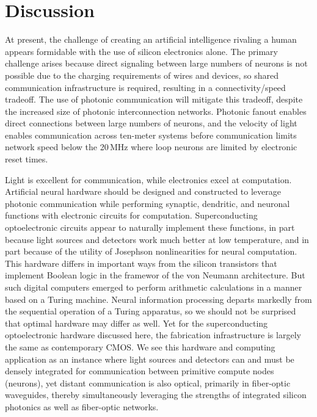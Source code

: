 \documentclass[twocolumn]{article}
\begin{document}
\section{\label{sec:discussion}Discussion}
At present, the challenge of creating an artificial intelligence rivaling a human appears formidable with the use of silicon electronics alone. The primary challenge arises because direct signaling between large numbers of neurons is not possible due to the charging requirements of wires and devices, so shared communication infrastructure is required, resulting in a connectivity/speed tradeoff. The use of photonic communication will mitigate this tradeoff, despite the increased size of photonic interconnection networks. Photonic fanout enables direct connections between large numbers of neurons, and the velocity of light enables communication across ten-meter systems before communication limits network speed below the 20\,MHz where loop neurons are limited by electronic reset times. 

Light is excellent for communication, while electronics excel at computation. Artificial neural hardware should be designed and constructed to leverage photonic communication while performing synaptic, dendritic, and neuronal functions with electronic circuits for computation. Superconducting optoelectronic circuits appear to naturally implement these functions, in part because light sources and detectors work much better at low temperature, and in part because of the utility of Josephson nonlinearities for neural computation. This hardware differs in important ways from the silicon transistors that implement Boolean logic in the framewor of the von Neumann architecture. But such digital computers emerged to perform arithmetic calculations in a manner based on a Turing machine. Neural information processing departs markedly from the sequential operation of a Turing apparatus, so we should not be surprised that optimal hardware may differ as well. Yet for the superconducting optoelectronic hardware discussed here, the fabrication infrastructure is largely the same as contemporary CMOS. We see this hardware and computing application as an instance where light sources and detectors can and must be densely integrated for communication between primitive compute nodes (neurons), yet distant communication is also optical, primarily in fiber-optic waveguides, thereby simultaneously leveraging the strengths of integrated silicon photonics as well as fiber-optic networks.
\end{document}
